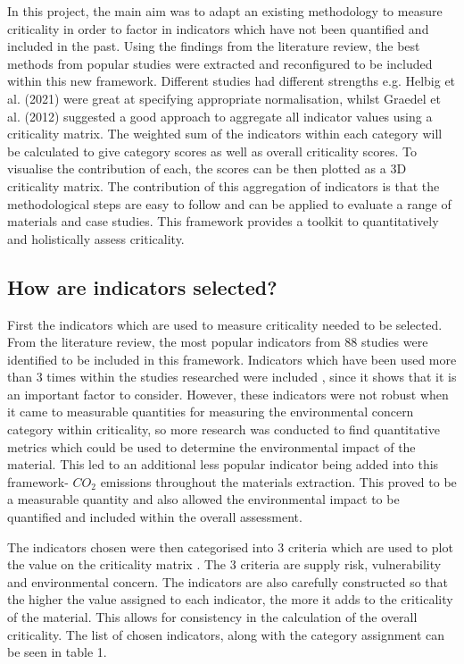 \documentclass{article}
\begin{document}
In this project, the main aim was to adapt an existing methodology to measure criticality in order to factor in indicators which have not been quantified and included in the past. Using the findings from the literature review, the best methods from popular studies were extracted and reconfigured to be included within this new framework. Different studies had different strengths e.g. Helbig et al. (2021) \cite{helbig2021overview} were great at specifying appropriate normalisation, whilst Graedel et al. (2012) \cite{graedel2019defining} suggested a good approach to aggregate all indicator values using a criticality matrix. The weighted sum of the indicators within each category will be calculated to give category scores as well as overall criticality scores. To visualise the contribution of each, the scores can be then plotted as a 3D criticality matrix. The contribution of this aggregation of indicators is that the methodological steps are easy to follow and can be applied to evaluate a range of materials and case studies. This framework provides a toolkit to quantitatively and holistically assess criticality. 

\subsection{How are indicators selected?}

First the indicators which are used to measure criticality needed to be selected. From the literature review, the most popular indicators from 88 studies were identified to be included in this framework. Indicators which have been used more than 3 times within the studies researched were included \cite{helbig2021overview}, since it shows that it is an important factor to consider. However, these indicators were not robust when it came to measurable quantities for measuring the environmental concern category within criticality, so more research was conducted to find quantitative metrics which could be used to determine the environmental impact of the material. This led to an additional less popular indicator being added into this framework- $CO_{2}$ emissions throughout the materials extraction. This proved to be a measurable quantity and also allowed the environmental impact to be quantified and included within the overall assessment. 

The indicators chosen were then categorised into 3 criteria which are used to plot the value on the criticality matrix \cite{nrc2008minerals}. The 3 criteria are supply risk, vulnerability and environmental concern. The indicators are also carefully constructed so that the higher the value assigned to each indicator, the more it adds to the criticality of the material. This allows for consistency in the calculation of the overall criticality. The list of chosen indicators, along with the category assignment can be seen in table 1. 
\end{document}
